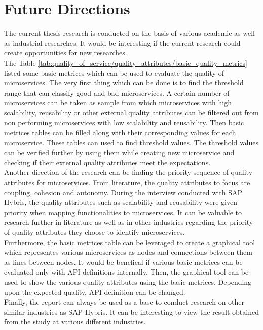 \chapter{Future Directions}\label{chapter:future_directions}
The current thesis research is conducted on the basis of various academic as well as industrial researches. It would be interesting if the current research could create opportunities for new researches.\\
The Table \ref {tab:quality_of_service/quality_attributes/basic_quality_metrics} listed some basic metrices which can be used to evaluate the quality of microservices. The very first thing which can be done is to find the threshold range that can classify good and bad microservices. A certain number of microservices can be taken as sample from which microservices with high scalability, reusability or other external quality attributes can be filtered out from non performing microservices with low scalability and reusability. Then basic metrices tables can be filled along with their corresponding values for each microservice. These tables can used to find threshold values. The threshold values can be verified further by using them while creating new microservice and checking if their external quality attributes meet the expectations.\\
Another direction of the research can be finding the priority sequence of quality attributes for microservices. From literature, the quality attributes to focus are coupling, cohesion and autonomy. During the interview conducted with SAP Hybris, the quality attributes such as scalability and reusability were given priority when mapping functionalities to microservices. It can be valuable to research further in literature as well as in other industries regarding the priority of quality attributes they choose to identify microservices.\\
Furthermore, the basic metrices table can be leveraged to create a graphical tool which representes various microservices as nodes and connections between them as lines between nodes. It would be benefical if various basic metrices can be evaluated only with \acrshort{API} definitions internally. Then, the graphical tool can be used to show the various quality attributes using the basic metrices. Depending upon the expected quality, \acrshort{API} definition can be changed.\\
Finally, the report can always be used as a base to conduct research on other similar industries as SAP Hybris. It can be interesting to view the result obtained from the study at various different industries.
